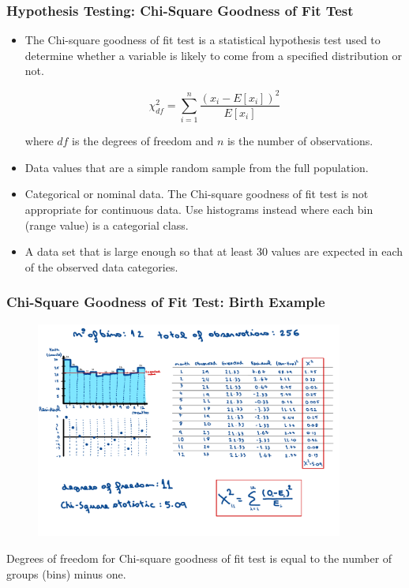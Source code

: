 \begin{frame}
    \frametitle{Hypothesis Testing: Chi-Square Goodness of Fit Test}

    \begin{itemize}
        \item The Chi-square goodness of fit test is a statistical hypothesis test used to determine 
        whether a variable is likely to come from a specified distribution or not.

        $$\chi^{2}_{df} = \sum_{i=1}^{n}\frac{(x_i - E[x_i])^2}{E[x_i]}$$

        where $df$ is the degrees of freedom and $n$ is the number of observations.

        \item Data values that are a simple random sample from the full population.

        \item Categorical or nominal data. The Chi-square goodness of fit test is not appropriate for 
        continuous data. Use histograms instead where each bin (range value) is a categorial class.

        \item A data set that is large enough so that at least 30 values are expected in 
        each of the observed data categories. 

    \end{itemize}
\end{frame}


\begin{frame}
    \frametitle{Chi-Square Goodness of Fit Test: Birth Example}
    \begin{figure}
        \centering
        \includegraphics[width=0.9\textwidth]{slides/figures/chi2_example_one.pdf}
    \end{figure}
    Degrees of freedom for Chi-square goodness of fit test is equal to the number of groups (bins) minus one.

\end{frame}

